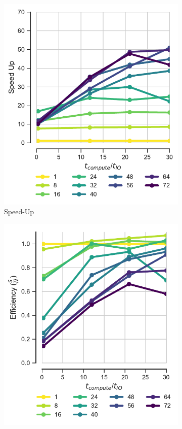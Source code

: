 \begin{figure}[ht!]
\begin{subfigure}{.3\textwidth}
  \includegraphics[width=\linewidth]{figures/Compute_to_IO_ratio_on_performance_2d_2_v17.pdf}
  \caption{Speed-Up}
  \label{fig:S2_tcomp_tIO_effect}
\end{subfigure}
\hfill
\begin{subfigure}{.3\textwidth}
  \includegraphics[width=\linewidth]{figures/Compute_to_IO_ratio_on_performance_2d_3_v17.pdf}

\end{subfigure}
\end{figure}
